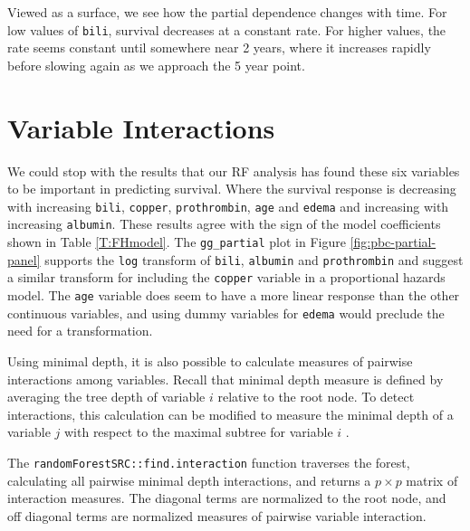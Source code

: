 \documentclass[article, nojss]{jss}
\begin{document}
Viewed as a surface, we see how the partial dependence changes with
time. For low values of \texttt{bili}, survival decreases at a constant
rate. For higher values, the rate seems constant until somewhere near 2
years, where it increases rapidly before slowing again as we approach
the 5 year point.

\section{Variable Interactions}\label{variable-interactions}

We could stop with the results that our RF analysis has found these six
variables to be important in predicting survival. Where the survival
response is decreasing with increasing \texttt{bili}, \texttt{copper},
\texttt{prothrombin}, \texttt{age} and \texttt{edema} and increasing
with increasing \texttt{albumin}. These results agree with the sign of
the \cite{fleming:1991} model coefficients shown in Table
\ref{T:FHmodel}. The \texttt{gg\_partial} plot in Figure
\ref{fig:pbc-partial-panel} supports the \texttt{log} transform of
\texttt{bili}, \texttt{albumin} and \texttt{prothrombin} and suggest a
similar transform for including the \texttt{copper} variable in a
proportional hazards model. The \texttt{age} variable does seem to have
a more linear response than the other continuous variables, and using
dummy variables for \texttt{edema} would preclude the need for a
transformation.

Using minimal depth, it is also possible to calculate measures of
pairwise interactions among variables. Recall that minimal depth measure
is defined by averaging the tree depth of variable \(i\) relative to the
root node. To detect interactions, this calculation can be modified to
measure the minimal depth of a variable \(j\) with respect to the
maximal subtree for variable \(i\) \citep{Ishwaran:2010,Ishwaran:2011}.

The \texttt{randomForestSRC::find.interaction} function traverses the
forest, calculating all pairwise minimal depth interactions, and returns
a \(p \times p\) matrix of interaction measures. The diagonal terms are
normalized to the root node, and off diagonal terms are normalized
measures of pairwise variable interaction.
\end{document}
